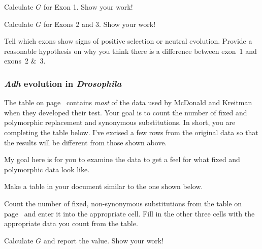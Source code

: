 \documentclass[12pt, addpoints, hidelinks]{exam}
\begin{document}
\begin{questions}

\question[5] Calculate $G$ for Exon 1. Show your work!

\question[5] Calculate $G$ for Exons 2 and 3. Show your work!

\question[5] Tell which exons show signs of positive selection or neutral evolution. Provide a reasonable hypothesis on why you think there is a difference between exon~1 and exons~2 \&~3.

%
%
%

\subsubsection*{\textit{Adh} evolution in \textit{Drosophila}}

The table on page~\pageref{mk_data} contains \emph{most} of the data used by McDonald and Kreitman when they developed their test. Your goal is to count the number of fixed and polymorphic replacement and synonymous substitutions. In short, you are completing the table below. I've excised a few rows from the original data so that the results will be different from those shown above.

My goal here is for you to examine the data to get a feel for what fixed and polymorphic data look like. 

\question Make a table in your document similar to the one shown below.

\question[5] Count the number of fixed, non-synonymous substitutions from the table on page~\pageref{mk_data} and enter it into the appropriate cell. Fill in the other three cells with the appropriate data you count from the table.

\question[5] Calculate $G$ and report the value. Show your work!

\end{questions}
\end{document}
